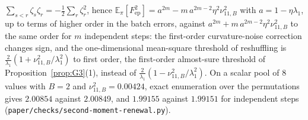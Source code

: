 \documentclass[11pt]{article}
\theoremstyle{remark}
\newcommand{\E}{\mathbb{E}}
\begin{document}
$\sum_{s<r}\zeta_s\zeta_r=-\frac12\sum_r\zeta_r^2$, hence $\E_\pi[F_{\mathrm{ep}}^2]=a^{2m}-m\,a^{2m-2}\eta^2\nu_{11,B}^2$ with $a=1-\eta\lambda_1$, up to terms of higher order in the batch errors, against $a^{2m}+m\,a^{2m-2}\eta^2\nu_{11,B}^2$ to the same order for $m$ independent steps: the first-order curvature-noise correction changes sign, and the one-dimensional mean-square threshold of reshuffling is $\frac2{\lambda_1}(1+\nu_{11,B}^2/\lambda_1^2)$ to first order, the first-order almost-sure threshold of Proposition~\ref{prop:G3}(1), instead of $\frac2{\lambda_1}(1-\nu_{11,B}^2/\lambda_1^2)$. On a scalar pool of $8$ values with $B=2$ and $\nu_{11,B}^2=0.00424$, exact enumeration over the permutations gives $2.00854$ against $2.00849$, and $1.99155$ against $1.99151$ for independent steps (\texttt{paper/checks/second-moment-renewal.py}).
\end{document}
